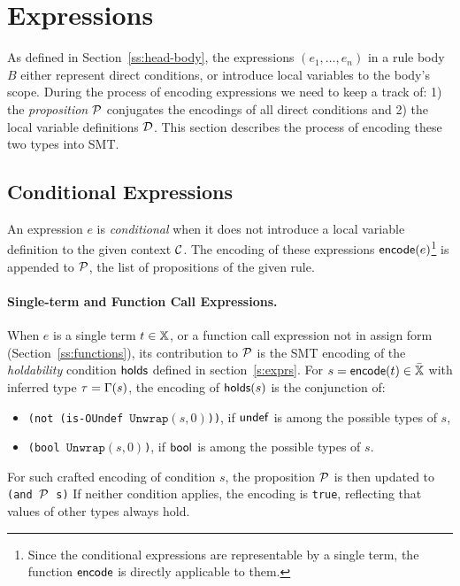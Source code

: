 \section{Expressions}
\label{s:expr:t}

As defined in Section~\ref{ss:head-body}, the expressions $(e_1, \dots, e_n)$ in a rule body $B$ either represent direct conditions, or introduce local variables to the body's scope.
During the process of encoding expressions we need to keep a track of: 1) the \emph{proposition} $\mathcal{P}$ conjugates the encodings of all direct conditions and 2) the local variable definitions $\mathcal{D}$.
This section describes the process of encoding these two types into SMT.

\subsection{Conditional Expressions}
\label{ss:expr:val}

An expression $e$ is \emph{conditional} when it does not introduce a local variable definition to the given context $\mathcal{C}$.
The encoding of these expressions $\mathsf{encode}(e)$\footnote{
  Since the conditional expressions are representable by a single term, the function $\mathsf{encode}$ is directly applicable to them.
} is appended to $\mathcal{P}$, the list of propositions of the given rule.

\paragraph{Single-term and Function Call Expressions.}
When $e$ is a single term $t \in \mathbb{X}$, or a function call expression not in assign form (Section~\ref{ss:functions}), its contribution to $\mathcal{P}$ is the SMT encoding of the \emph{holdability} condition $\mathsf{holds}$ defined in section~\ref{s:exprs}.
For $s = \mathsf{encode}(t) \in \bar{\mathbb{X}}$ with inferred type $\tau = \Gamma(s)$, the encoding of $\mathsf{holds}(s)$ is the conjunction of:
\begin{itemize}
  \item \texttt{(not (is-OUndef $\texttt{Unwrap}(s, 0)$))}, if $\mathsf{undef}$ is among the possible types of $s$,
  \item \texttt{(bool $\texttt{Unwrap}(s, 0)$)}, if $\mathsf{bool}$ is among the possible types of $s$.
\end{itemize}
For such crafted encoding of condition $s$, the proposition $\mathcal{P}$ is then updated to \texttt{(and $\mathcal{P}$ s)}
If neither condition applies, the encoding is \texttt{true}, reflecting that values of other types always hold.

